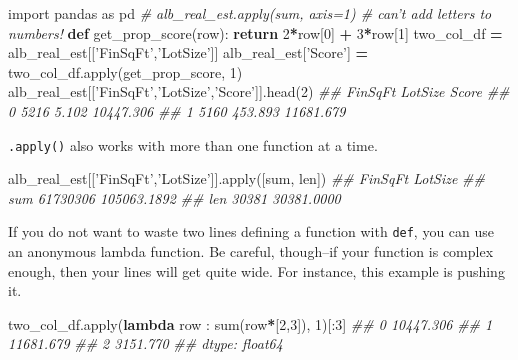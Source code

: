 \documentclass[12pt,krantz2]{krantz}
\makeatletter
\newenvironment{Shaded}{\begin{snugshade}}{\end{snugshade}}
\newcommand{\BuiltInTok}[1]{#1}
\newcommand{\CommentTok}[1]{\textcolor[rgb]{0.37,0.37,0.37}{\textit{#1}}}
\newcommand{\ControlFlowTok}[1]{\textcolor[rgb]{0.27,0.27,0.27}{\textbf{#1}}}
\newcommand{\DecValTok}[1]{\textcolor[rgb]{0.06,0.06,0.06}{#1}}
\newcommand{\ImportTok}[1]{#1}
\newcommand{\KeywordTok}[1]{\textcolor[rgb]{0.27,0.27,0.27}{\textbf{#1}}}
\newcommand{\NormalTok}[1]{#1}
\newcommand{\OperatorTok}[1]{\textcolor[rgb]{0.43,0.43,0.43}{\textbf{#1}}}
\newcommand{\StringTok}[1]{\textcolor[rgb]{0.5,0.5,0.5}{#1}}
\newenvironment{kframe}{%
\medskip{}
\setlength{\fboxsep}{.8em}
 \def\at@end@of@kframe{}%
 \ifinner\ifhmode%
  \def\at@end@of@kframe{\end{minipage}}%
  \begin{minipage}{\columnwidth}%
 \fi\fi%
 \def\FrameCommand##1{\hskip\@totalleftmargin \hskip-\fboxsep
 \colorbox{shadecolor}{##1}\hskip-\fboxsep
     \hskip-\linewidth \hskip-\@totalleftmargin \hskip\columnwidth}%
 \MakeFramed {\advance\hsize-\width
   \@totalleftmargin\z@ \linewidth\hsize
   \@setminipage}}%
 {\par\unskip\endMakeFramed%
 \at@end@of@kframe}
\renewenvironment{Shaded}{\begin{kframe}}{\end{kframe}}
\makeatother
\begin{document}
\begin{Shaded}
\begin{Highlighting}[]
\ImportTok{import}\NormalTok{ pandas }\ImportTok{as}\NormalTok{ pd}
\CommentTok{# alb_real_est.apply(sum, axis=1) # can't add letters to numbers!}
\KeywordTok{def}\NormalTok{ get_prop_score(row):}
    \ControlFlowTok{return} \DecValTok{2}\OperatorTok{*}\NormalTok{row[}\DecValTok{0}\NormalTok{] }\OperatorTok{+} \DecValTok{3}\OperatorTok{*}\NormalTok{row[}\DecValTok{1}\NormalTok{]}
\NormalTok{two_col_df }\OperatorTok{=}\NormalTok{ alb_real_est[[}\StringTok{'FinSqFt'}\NormalTok{,}\StringTok{'LotSize'}\NormalTok{]]}
\NormalTok{alb_real_est[}\StringTok{'Score'}\NormalTok{] }\OperatorTok{=}\NormalTok{ two_col_df.}\BuiltInTok{apply}\NormalTok{(get_prop_score, }\DecValTok{1}\NormalTok{)}
\NormalTok{alb_real_est[[}\StringTok{'FinSqFt'}\NormalTok{,}\StringTok{'LotSize'}\NormalTok{,}\StringTok{'Score'}\NormalTok{]].head(}\DecValTok{2}\NormalTok{)}
\CommentTok{##    FinSqFt  LotSize      Score}
\CommentTok{## 0     5216    5.102  10447.306}
\CommentTok{## 1     5160  453.893  11681.679}
\end{Highlighting}
\end{Shaded}

\texttt{.apply()} also works with more than one function at a time.

\begin{Shaded}
\begin{Highlighting}[]
\NormalTok{alb_real_est[[}\StringTok{'FinSqFt'}\NormalTok{,}\StringTok{'LotSize'}\NormalTok{]].}\BuiltInTok{apply}\NormalTok{([}\BuiltInTok{sum}\NormalTok{, }\BuiltInTok{len}\NormalTok{])}
\CommentTok{##       FinSqFt      LotSize}
\CommentTok{## sum  61730306  105063.1892}
\CommentTok{## len     30381   30381.0000}
\end{Highlighting}
\end{Shaded}

If you do not want to waste two lines defining a function with \texttt{def}, you can use an anonymous lambda function. Be careful, though--if your function is complex enough, then your lines will get quite wide. For instance, this example is pushing it.

\begin{Shaded}
\begin{Highlighting}[]
\NormalTok{two_col_df.}\BuiltInTok{apply}\NormalTok{(}\KeywordTok{lambda}\NormalTok{ row : }\BuiltInTok{sum}\NormalTok{(row}\OperatorTok{*}\NormalTok{[}\DecValTok{2}\NormalTok{,}\DecValTok{3}\NormalTok{]), }\DecValTok{1}\NormalTok{)[:}\DecValTok{3}\NormalTok{]}
\CommentTok{## 0    10447.306}
\CommentTok{## 1    11681.679}
\CommentTok{## 2     3151.770}
\CommentTok{## dtype: float64}
\end{Highlighting}
\end{Shaded}
\end{document}
